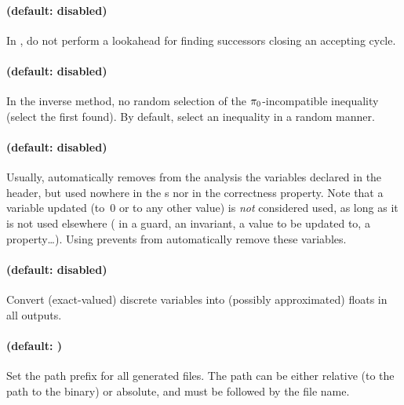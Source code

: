 \paragraph{ (default: disabled)}
In , do not perform a lookahead for finding successors
closing an accepting cycle.


\paragraph{ (default: disabled)}
In the inverse method, no random selection of the $\pi_0$-incompatible inequality (select the first found).
By default, select an inequality in a random manner.



\paragraph{ (default: disabled)}
Usually, \imitator{} automatically removes from the analysis the variables declared in the header, but used nowhere in the \IPTA{}s nor in the correctness property.
Note that a variable updated (to~0 or to any other value) is \emph{not} considered used, as long as it is not used elsewhere (\ie{} in a guard, an invariant, a value to be updated to, a property…).
Using  prevents \imitator{} from automatically remove these variables.



\paragraph{ (default: disabled)}
Convert (exact-valued) discrete variables into (possibly approximated) floats in all outputs.


\paragraph{ (default: )}
Set the path prefix for all generated files.
The path can be either relative (to the path to the \stylePath{\binimitator{}} binary) or absolute, and must be followed by the file name.

